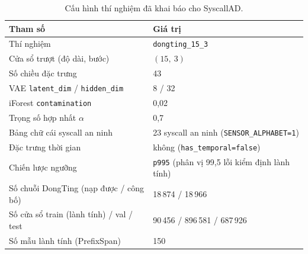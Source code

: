 \begin{table}[htbp]
  \centering
  \caption{Cấu hình thí nghiệm đã khai báo cho SyscallAD.}
  \label{tab:config}
  \begin{tabular}{ll}
    \toprule
    \textbf{Tham số} & \textbf{Giá trị} \\
    \midrule
    Thí nghiệm & \texttt{dongting\_15\_3} \\
    Cửa sổ trượt (độ dài, bước) & $(15,\ 3)$ \\
    Số chiều đặc trưng & 43 \\
    VAE \texttt{latent\_dim} / \texttt{hidden\_dim} & 8 / 32 \\
    iForest \texttt{contamination} & 0{,}02 \\
    Trọng số hợp nhất $\alpha$ & 0{,}7 \\
    Bảng chữ cái syscall an ninh & 23 syscall an ninh (\texttt{SENSOR\_ALPHABET=1}) \\
    Đặc trưng thời gian & không (\texttt{has\_temporal=false}) \\
    Chiến lược ngưỡng & \texttt{p995} (phân vị 99,5 lỗi kiểm định lành tính) \\
    \midrule
    Số chuỗi DongTing (nạp được / công bố) & 18\,874 / 18\,966 \\
    Số cửa sổ train (lành tính) / val / test & 90\,456 / 896\,581 / 687\,926 \\
    Số mẫu lành tính (PrefixSpan) & 150 \\
    \bottomrule
  \end{tabular}
\end{table}


